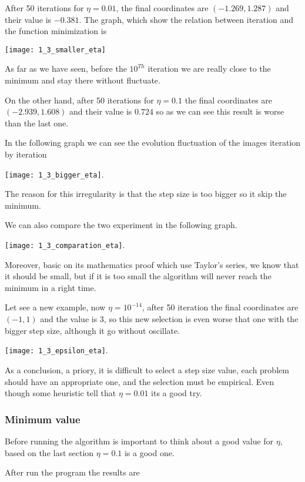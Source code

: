   After 50 iterations for  $\eta = 0.01$, the  final coordinates are $(-1.269, 1.287)$ and their value is $-0.381$. The graph, which show the relation between iteration and the function minimization is


  \texttt{[image: 1\_3\_smaller\_eta]}

  As far as we have seen, before the $10^{Th}$ iteration we are really close to  the minimum and stay there without fluctuate.

  On the other hand, after 50 iterations for  $\eta = 0.1$ the final coordinates are $(-2.939, 1.608)$ and their value is $0.724$ so as we can see this result is worse than the last one.

  In the following graph we can see the evolution fluctuation of the images iteration by iteration 

  \texttt{[image: 1\_3\_bigger\_eta]}.

 The reason for this irregularity  is that the step size is too bigger so it skip the minimum.

 We can also  compare the two experiment in the following graph.
 
\texttt{[image: 1\_3\_comparation\_eta]}.


    Moreover, basic on its mathematics proof which use Taylor's series, we know that it should be small, but if it is too small the algorithm will never reach the minimum in a right time.

 Let see a new example, now $\eta = 10^{-14}$, after 50 iteration  the final coordinates are $(-1, 1)$  and the value is $3$, so this new selection is even worse that one with the bigger step size, although it go without oscillate.  

 \texttt{[image: 1\_3\_epsilon\_eta]}.
 
    
  As a conclusion, a priory, it is difficult to select a step size value, each problem should have an appropriate one, and the selection must be empirical. Even though some heuristic \cite{LFD} tell that $\eta = 0.01$ its a good try.  


  

\subsubsection{Minimum value }


Before running the algorithm is important to think about a good value for $\eta$, based on the last section $\eta = 0.1$ is a good one. 


After run the program the  results are

